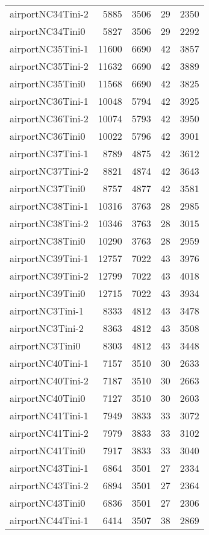 \begin{longtable}{lrrrr}
airportNC34Tini-2 & 5885 & 3506 & 29 & 2350 \\
airportNC34Tini0 & 5827 & 3506 & 29 & 2292 \\
airportNC35Tini-1 & 11600 & 6690 & 42 & 3857 \\
airportNC35Tini-2 & 11632 & 6690 & 42 & 3889 \\
airportNC35Tini0 & 11568 & 6690 & 42 & 3825 \\
airportNC36Tini-1 & 10048 & 5794 & 42 & 3925 \\
airportNC36Tini-2 & 10074 & 5793 & 42 & 3950 \\
airportNC36Tini0 & 10022 & 5796 & 42 & 3901 \\
airportNC37Tini-1 & 8789 & 4875 & 42 & 3612 \\
airportNC37Tini-2 & 8821 & 4874 & 42 & 3643 \\
airportNC37Tini0 & 8757 & 4877 & 42 & 3581 \\
airportNC38Tini-1 & 10316 & 3763 & 28 & 2985 \\
airportNC38Tini-2 & 10346 & 3763 & 28 & 3015 \\
airportNC38Tini0 & 10290 & 3763 & 28 & 2959 \\
airportNC39Tini-1 & 12757 & 7022 & 43 & 3976 \\
airportNC39Tini-2 & 12799 & 7022 & 43 & 4018 \\
airportNC39Tini0 & 12715 & 7022 & 43 & 3934 \\
airportNC3Tini-1 & 8333 & 4812 & 43 & 3478 \\
airportNC3Tini-2 & 8363 & 4812 & 43 & 3508 \\
airportNC3Tini0 & 8303 & 4812 & 43 & 3448 \\
airportNC40Tini-1 & 7157 & 3510 & 30 & 2633 \\
airportNC40Tini-2 & 7187 & 3510 & 30 & 2663 \\
airportNC40Tini0 & 7127 & 3510 & 30 & 2603 \\
airportNC41Tini-1 & 7949 & 3833 & 33 & 3072 \\
airportNC41Tini-2 & 7979 & 3833 & 33 & 3102 \\
airportNC41Tini0 & 7917 & 3833 & 33 & 3040 \\
airportNC43Tini-1 & 6864 & 3501 & 27 & 2334 \\
airportNC43Tini-2 & 6894 & 3501 & 27 & 2364 \\
airportNC43Tini0 & 6836 & 3501 & 27 & 2306 \\
airportNC44Tini-1 & 6414 & 3507 & 38 & 2869 \\

\end{longtable}
